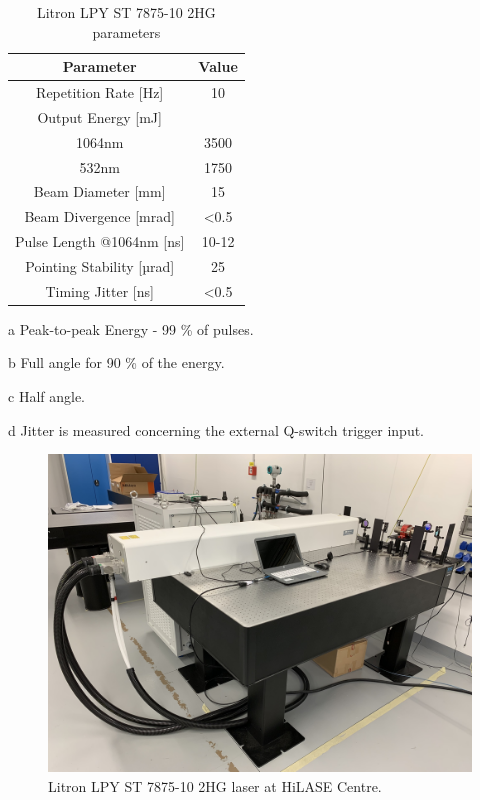 \begin{table}[h!]
\centering
    \begin{threeparttable}
        \begin{tabular}{||c | c||} 
        \hline
            \textbf{Parameter} & \textbf{Value} \\ [0.5ex] 
        \hline\hline
        Repetition Rate [Hz] & 10  \\ 
        \hline
            Output Energy [mJ] & \\
            1064nm & 3500 \\
            532nm & 1750 \\
        \hline
            Beam Diameter [mm] & 15 \tnote{a} \\
        \hline
            Beam Divergence [mrad] & <0.5 \tnote{b} \\ 
        \hline
            Pulse Length @1064nm [ns] & 10-12 \\
        \hline
            Pointing Stability [µrad] & 25 \tnote{c} \\
        \hline
            Timing Jitter [ns] & <0.5 \tnote{d}  \\
        \hline
        \hline
        \end{tabular}
        \begin{tablenotes}
            \small
            \item[a] Peak-to-peak Energy - 99 \% of pulses. 
            \item[b] Full angle for 90 \% of the energy.
            \item[c] Half angle.
            \item[d] Jitter is measured concerning the external Q-switch trigger input.
        \end{tablenotes}
    
        \caption{Litron LPY ST 7875-10 2HG parameters}
        \label{litronparameters}
    \end{threeparttable}
\end{table}

\begin{figure}[h]
    \centering
    \includegraphics[width=0.6\linewidth]{img/litron.JPG}
    \caption{Litron LPY ST 7875-10 2HG laser at HiLASE Centre.}
    \label{fig:litron}
\end{figure}





